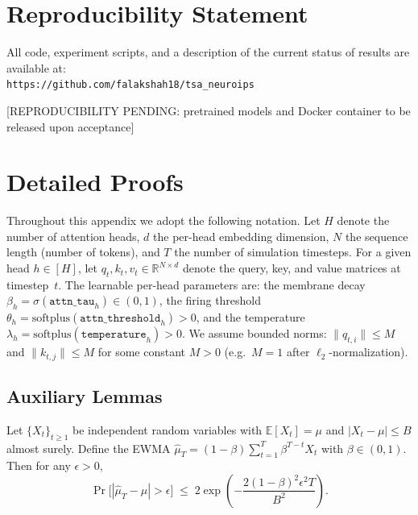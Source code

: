 \documentclass{article}
\begin{document}
\section*{Reproducibility Statement}

All code, experiment scripts, and a description of the current status of results are available at: \\
\texttt{https://github.com/falakshah18/tsa\_neuroips}

[REPRODUCIBILITY PENDING: pretrained models and Docker container to be released upon acceptance]




\appendix


\section{Detailed Proofs}\label{app:proofs}

Throughout this appendix we adopt the following notation.
Let $H$ denote the number of attention heads, $d$ the per-head embedding dimension,
$N$ the sequence length (number of tokens), and $T$ the number of simulation timesteps.
For a given head $h \in [H]$, let $q_t, k_t, v_t \in \mathbb{R}^{N \times d}$ denote the
query, key, and value matrices at timestep~$t$.
The learnable per-head parameters are:
the membrane decay $\beta_h = \sigma(\texttt{attn\_tau}_h) \in (0,1)$,
the firing threshold $\theta_h = \mathrm{softplus}(\texttt{attn\_threshold}_h) > 0$,
and the temperature $\lambda_h = \mathrm{softplus}(\texttt{temperature}_h) > 0$.
We assume bounded norms: $\|q_{t,i}\| \le M$ and $\|k_{t,j}\| \le M$
for some constant $M > 0$ (e.g.\ $M = 1$ after $\ell_2$-normalization).

\subsection{Auxiliary Lemmas}\label{sec:auxiliary}

\begin{lemma}\label{lem:ewma}
Let $\{X_t\}_{t \ge 1}$ be independent random variables with
$\mathbb{E}[X_t] = \mu$ and $|X_t - \mu| \le B$ almost surely.
Define the EWMA
$\widehat{\mu}_T = (1 - \beta) \sum_{t=1}^{T} \beta^{T-t} X_t$
with $\beta \in (0,1)$.
Then for any $\epsilon > 0$,
\[
  \Pr\!\bigl[|\widehat{\mu}_T - \mu| > \epsilon\bigr]
  \;\le\; 2\exp\!\left(-\frac{2(1-\beta)^2 \epsilon^2 T}{B^2}\right).
\]
\end{lemma}
\end{document}
